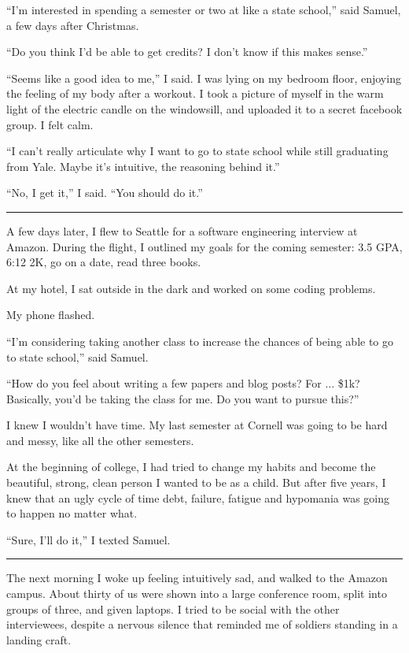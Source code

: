 ``I'm interested in spending a semester or two at like a state school,'' said
Samuel, a few days after Christmas.  

``Do you think I'd be able to get credits?  I don't know if this makes sense.''


``Seems like a good idea to me,'' I said.  I was lying on my bedroom floor,
enjoying the feeling of my body after a workout.  I took a picture of myself in
the warm light of the electric candle on the windowsill, and uploaded it to a
secret facebook group.  I felt calm.

``I can't really articulate why I want to go to state school while still
graduating from Yale.  Maybe it's intuitive, the reasoning behind it.'' 

``No, I get it,'' I said. ``You should do it.''

\plainfancybreak{12pt}{2}{}

A few days later, I flew to Seattle for a software engineering interview at
Amazon.  During the flight, I outlined my goals for the coming semester: 3.5 GPA,
6:12 2K, go on a date, read three books.  


At my hotel, I sat outside in the dark and worked on some coding problems. 

My phone flashed.

``I'm considering taking another class to increase the chances of being able to
go to state school,'' said Samuel.  

``How do you feel about writing a few papers and blog posts?  For ... \$1k?
Basically, you'd be taking the class for me.  Do you want to pursue this?'' 

I knew I wouldn't have time.  My last semester at Cornell was going to be hard
and messy, like all the other semesters.


At the beginning of college, I had tried to change my habits and become the
beautiful, strong, clean person I wanted to be as a child.  But after five
years, I knew that an ugly cycle of time debt, failure, fatigue and hypomania
was going to happen no matter what.  

``Sure, I'll do it,'' I texted Samuel.

\plainfancybreak{12pt}{2}{}

The next morning I woke up feeling intuitively sad, and walked to the Amazon
campus.  About thirty of us were shown into a large conference room, split into
groups of three, and given laptops.  I tried to be social with the other
interviewees, despite a nervous silence that reminded me of soldiers standing in
a landing craft. 

